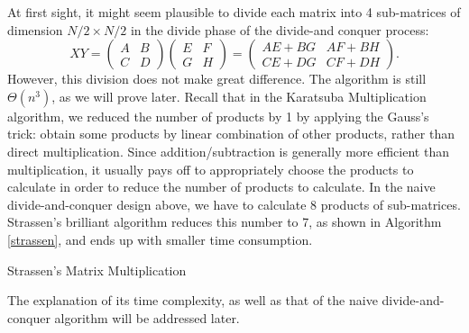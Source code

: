 At first sight, it might seem plausible to divide each matrix into 4 sub-matrices of dimension $N/2\times N/2$ in the divide phase of the divide-and conquer process:
\begin{equation*}
XY=\begin{pmatrix}A&B\\C&D\end{pmatrix}\begin{pmatrix}E&F\\G&H\end{pmatrix}=
\begin{pmatrix}
AE+BG&AF+BH\\CE+DG&CF+DH
\end{pmatrix}.
\end{equation*}
However, this division does not make great difference. The algorithm is still $\Theta(n^3)$, as we will prove later. Recall that in the Karatsuba Multiplication algorithm, we reduced the number of products by 1 by applying the Gauss's trick: obtain some products by linear combination of other products, rather than direct multiplication. Since addition/subtraction is generally more efficient than multiplication, it usually pays off to appropriately choose the products to calculate in order to reduce the number of products to calculate. In the naive divide-and-conquer design above, we have to calculate 8 products of sub-matrices. Strassen's brilliant algorithm reduces this number to 7, as shown in Algorithm \ref{strassen}, and ends up with smaller time consumption. 
\begin{algorithm}
\caption{Strassen's Matrix Multiplication}\label{strassen}
\begin{algorithmic}[1]
\Input{}
\Output{}
\end{algorithmic}
\end{algorithm}
The explanation of its time complexity, as well as that of the naive divide-and-conquer algorithm will be addressed later. 
